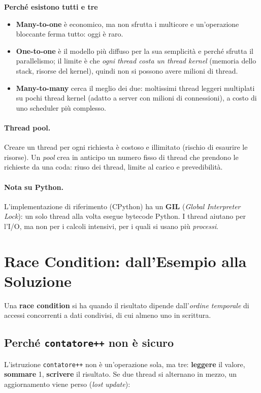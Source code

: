 \textbf{Perché esistono tutti e tre}
\begin{itemize}
    \item \textbf{Many-to-one} è economico, ma non sfrutta i multicore e un'operazione bloccante ferma tutto: oggi è raro.
    \item \textbf{One-to-one} è il modello più diffuso per la sua semplicità e perché sfrutta il parallelismo; il limite è che \emph{ogni thread costa un thread kernel} (memoria dello stack, risorse del kernel), quindi non si possono avere milioni di thread.
    \item \textbf{Many-to-many} cerca il meglio dei due: moltissimi thread leggeri multiplati su pochi thread kernel (adatto a server con milioni di connessioni), a costo di uno scheduler più complesso.
\end{itemize}

\paragraph{Thread pool.} Creare un thread per ogni richiesta è costoso e illimitato (rischio di esaurire le risorse). Un \emph{pool} crea in anticipo un numero fisso di thread che prendono le richieste da una coda: riuso dei thread, limite al carico e prevedibilità.

\paragraph{Nota su Python.} L'implementazione di riferimento (CPython) ha un \textbf{GIL} (\emph{Global Interpreter Lock}): un solo thread alla volta esegue bytecode Python. I thread aiutano per l'I/O, ma non per i calcoli intensivi, per i quali si usano più \emph{processi}.

\section{Race Condition: dall'Esempio alla Soluzione}
Una \textbf{race condition} si ha quando il risultato dipende dall'\emph{ordine temporale} di accessi concorrenti a dati condivisi, di cui almeno uno in scrittura.

\subsection{Perché \texttt{contatore++} non è sicuro}
L'istruzione \texttt{contatore++} non è un'operazione sola, ma tre: \textbf{leggere} il valore, \textbf{sommare} 1, \textbf{scrivere} il risultato. Se due thread si alternano in mezzo, un aggiornamento viene perso (\emph{lost update}):

